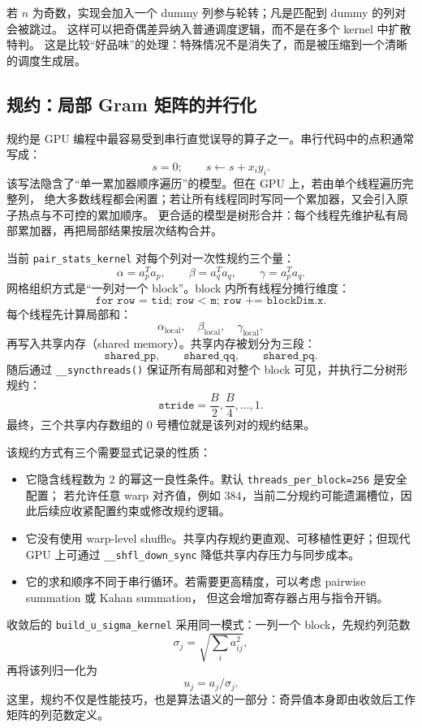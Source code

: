 若 \(n\) 为奇数，实现会加入一个 dummy 列参与轮转；凡是匹配到 dummy 的列对会被跳过。
这样可以把奇偶差异纳入普通调度逻辑，而不是在多个 kernel 中扩散特判。
这是比较“好品味”的处理：特殊情况不是消失了，而是被压缩到一个清晰的调度生成层。

\subsection{规约：局部 Gram 矩阵的并行化}

规约是 GPU 编程中最容易受到串行直觉误导的算子之一。串行代码中的点积通常写成：
\[
    s=0;\qquad s\leftarrow s+x_i y_i.
\]
该写法隐含了“单一累加器顺序遍历”的模型。但在 GPU 上，若由单个线程遍历完整列，
绝大多数线程都会闲置；若让所有线程同时写同一个累加器，又会引入原子热点与不可控的累加顺序。
更合适的模型是树形合并：每个线程先维护私有局部累加器，再把局部结果按层次结构合并。

当前 \texttt{pair\_stats\_kernel} 对每个列对一次性规约三个量：
\[
    \alpha=a_p^Ta_p,\qquad
    \beta=a_q^Ta_q,\qquad
    \gamma=a_p^Ta_q.
\]
网格组织方式是“一列对一个 block”。block 内所有线程分摊行维度：
\[
    \texttt{for row = tid; row < m; row += blockDim.x}.
\]
每个线程先计算局部和：
\[
    \alpha_{\text{local}},\quad
    \beta_{\text{local}},\quad
    \gamma_{\text{local}},
\]
再写入共享内存（shared memory）。共享内存被划分为三段：
\[
    \texttt{shared\_pp},\qquad
    \texttt{shared\_qq},\qquad
    \texttt{shared\_pq}.
\]
随后通过 \texttt{\_\_syncthreads()} 保证所有局部和对整个 block 可见，并执行二分树形规约：
\[
    \texttt{stride}=\frac{B}{2},\frac{B}{4},\ldots,1.
\]
最终，三个共享内存数组的 \(0\) 号槽位就是该列对的规约结果。

该规约方式有三个需要显式记录的性质：

\begin{itemize}
    \item 它隐含线程数为 \(2\) 的幂这一良性条件。默认 \texttt{threads\_per\_block=256} 是安全配置；
          若允许任意 warp 对齐值，例如 \(384\)，当前二分规约可能遗漏槽位，因此后续应收紧配置约束或修改规约逻辑。
    \item 它没有使用 warp-level shuffle。共享内存规约更直观、可移植性更好；但现代 GPU 上可通过
          \texttt{\_\_shfl\_down\_sync} 降低共享内存压力与同步成本。
    \item 它的求和顺序不同于串行循环。若需要更高精度，可以考虑 pairwise summation 或 Kahan summation，
          但这会增加寄存器占用与指令开销。
\end{itemize}

收敛后的 \texttt{build\_u\_sigma\_kernel} 采用同一模式：一列一个 block，先规约列范数
\[
    \sigma_j=\sqrt{\sum_i a_{ij}^2},
\]
再将该列归一化为
\[
    u_j=a_j/\sigma_j.
\]
这里，规约不仅是性能技巧，也是算法语义的一部分：奇异值本身即由收敛后工作矩阵的列范数定义。


